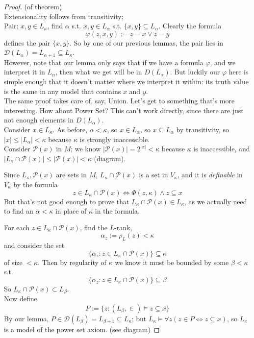 \documentclass[a4paper]{article}
\begin{document}
\begin{proof} (of theorem)\\
Extensionality follows from transitivity;\\
Pair: $x,y \in L_\kappa$, find $\alpha$ s.t. $x,y \in L_\alpha$ s.t. $\{x,y\} \subseteq L_\alpha$. Clearly the formula
\[
\varphi(z,x,y) := z=x \vee z=y
\]
defines the pair $\{x,y\}$. So by one of our previous lemmas, the pair lies in $\mathcal{D}(L_\alpha) = L_{\alpha+1} \subseteq L_\kappa$.\\
However, note that our lemma only says that if we have a formula $\varphi$, and we interpret it in $L_\alpha$, then what we get will be in $D(L_\alpha)$. But luckily our $\varphi$ here is simple enough that it doesn't matter where we interpret it within: its truth value is the same in any model that contains $x$ and $y$.\\
The same proof takes care of, say, Union. Let's get to something that's more interesting. How about Power Set? This can't work directly, since there are just not enough elements in $D(L_\alpha)$.\\
Consider $x \in L_\kappa$. As before, $\alpha < \kappa$, so $x \in L_\alpha$, so $x \subseteq L_\alpha$ by transitivity, so $|x| \leq |L_\alpha| < \kappa$ because $\kappa$ is strongly inaccessible.\\
Consider $\mathcal{P}(x)$ in $M$; we know $|\mathcal{P}(x)| = 2^{|x|} < \kappa$ because $\kappa$ is inaccessible, and $|L_\kappa \cap \mathcal{P}(x)| \leq |\mathcal{P}(x)| < \kappa$ (diagram).
\begin{rem}
Since $L_\kappa,\mathcal{P}(x)$ are sets in $M$, $L_\kappa \cap \mathcal{P}(x)$ is a set in $V_\kappa$, and it is \emph{definable} in $V_\kappa$ by the formula
\[
z \in L_\kappa \cap \mathcal{P}(x) \iff \Phi(z,\kappa) \wedge z \subseteq x
\]
But that's not good enough to prove that $L_\kappa \cap \mathcal{P}(x) \in L_\kappa$, as we actually need to find an $\alpha<\kappa$ in place of $\kappa$ in the formula.
\end{rem}
For each $z \in L_\kappa \cap \mathcal{P}(x)$, find the $L$-rank,
\[
\alpha_z:=\rho_L(z) < \kappa
\]
and consider the set
\[
\{\alpha_z: z \in L_\kappa \cap \mathcal{P}(x)\} \subseteq \kappa
\]
of size $<\kappa$. Then by regularity of $\kappa$ we know it must be bounded by some $\beta < \kappa$ s.t.
\[
\{\alpha_z: z \in L_\kappa \cap \mathcal{P}(x)\} \subseteq \beta
\]
So $L_\kappa \cap \mathcal{P}(x) \subset L_\beta$.\\
Now define
\[
P:=\{z: (L_\beta,\in) \vDash z \subseteq x\}
\]
By our lemma, $P \in \mathcal{D}(L_\beta) = L_{\beta+1} \subseteq L_\kappa$; but $L_\kappa \vDash \forall z (z \in P \iff z \subseteq x)$, so $L_\kappa$ is a model of the power set axiom. (see diagram)


\end{proof}
\end{document}
